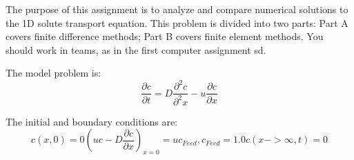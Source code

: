 

\setlength\parindent{0pt}

\maketitle %
\tableofcontents
\newpage 





\pagestyle{fancy}


The purpose of this assignment is to analyze and compare numerical solutions to the 1D solute transport equation. This problem is divided into two parts: Part A covers finite difference methods; Part B covers finite element methods. You should work in teams, as in the first computer assignment sd.

The model problem is:
\begin{equation} 
  \label{eq:1}
  \frac{\partial c}{\partial t} = D\frac{\partial^2 c}{\partial^2 x}-u\frac{\partial c}{\partial x}
\end{equation}

The initial and boundary conditions are:
\begin{subequations}
  \begin{equation} 
    \label{eq:2a}
    c(x,0)=0 
  \end{equation}
  \begin{equation} 
    \label{eq:2b}
    (uc-D\frac{\partial c}{\partial x})_{x=0}=uc_{Feed}, c_{Feed}=1.0
  \end{equation}
  \begin{equation} 
    \label{eq:2c}
    c(x -> \infty, t)=0
  \end{equation}
\end{subequations}










